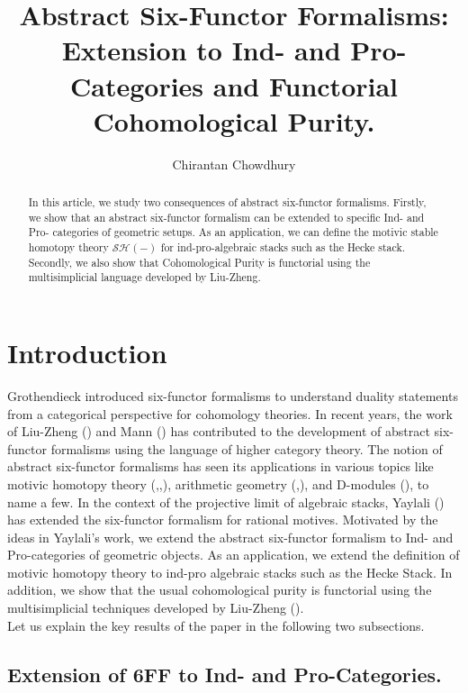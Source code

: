 \documentclass[14pt]{article}
\title{Abstract Six-Functor Formalisms: Extension to Ind- and Pro- Categories and Functorial Cohomological Purity.}
\author{Chirantan Chowdhury}
\theoremstyle{definition}
\numberwithin{subsection}{section}
\newcommand{\SH}{\mathcal{SH}}
\begin{document}
\maketitle{}
\begin{abstract}
In this article, we study two consequences of abstract six-functor formalisms. Firstly, we  show that an abstract six-functor formalism can be extended to specific Ind- and Pro- categories of geometric setups. As an application, we can define the motivic stable homotopy theory $\SH(-)$ for ind-pro-algebraic stacks such as the Hecke stack. Secondly, we also show that Cohomological Purity is functorial using the multisimplicial language developed by Liu-Zheng.
    
\end{abstract}
\tableofcontents
\section{Introduction}

Grothendieck introduced six-functor formalisms to understand duality statements from a categorical perspective for cohomology theories.
In recent years, the work of Liu-Zheng (\cite{liu2017enhanced}) and Mann (\cite{mann2022padic}) has contributed to the development of abstract six-functor formalisms using the language of higher category theory. The notion of abstract six-functor formalisms has seen its applications in various topics like motivic homotopy theory (\cite{Khan-Ravi_Generalised_Coh_Stacks},\cite{Chowdhury},\cite{chowdhury2025nonrepresentablesixfunctorformalisms}), arithmetic geometry (\cite{mann2022padic},\cite{berkovichmotives}), and D-modules (\cite{soor2025sixfunctorformalismquasicoherentsheaves}), to name a few. In the context of the  projective limit of algebraic stacks, Yaylali (\cite{yaylali2025rationalmotivesproalgebraicstacks}) has extended the six-functor formalism for rational motives. Motivated by the ideas in Yaylali's work, we extend the abstract six-functor formalism to Ind- and Pro-categories of geometric objects. As an application, we extend the definition of motivic homotopy theory to ind-pro algebraic stacks such as the Hecke Stack. In addition, we show that the usual cohomological purity is functorial using the multisimplicial techniques developed by Liu-Zheng (\cite{liu2017enhanced}).\\

Let us explain the key results of the paper in the following two subsections.


\subsection{Extension of 6FF to Ind- and Pro-Categories.}
\end{document}
